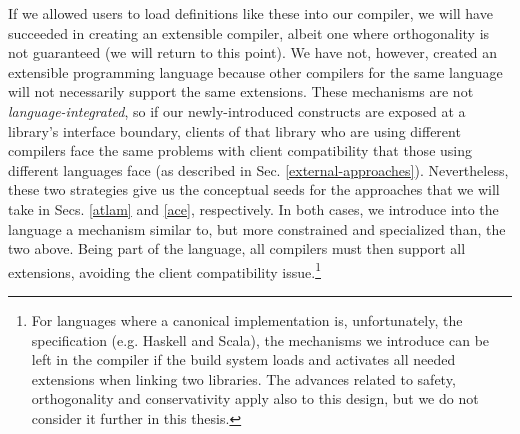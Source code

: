 If we allowed users to load definitions like these into our compiler, we will have succeeded in creating an  extensible compiler, albeit one where orthogonality is not guaranteed (we will return to this point). We have not, however, created an extensible programming language because other compilers for the same language will not necessarily support the same extensions. These mechanisms are not \emph{language-integrated}, so if our newly-introduced constructs are exposed at a library's  interface boundary, clients of that library who are using different compilers face the same problems with client compatibility that those using different languages face (as described in Sec. \ref{external-approaches}). %
Nevertheless, these two strategies give us the conceptual seeds for the approaches that we will take in Secs. \ref{atlam} and \ref{ace}, respectively. 
In both cases, we introduce into the language a mechanism similar to, but more constrained and specialized  than, the two above.  Being part of the language, all compilers must then support all extensions, avoiding the client compatibility issue.\footnote{For  languages where a canonical implementation {is}, unfortunately, the specification (e.g. Haskell and Scala), the mechanisms we introduce can be left in the compiler if the build system loads and activates all needed extensions when linking two libraries. The advances related to safety, orthogonality and conservativity apply also to this design, but we do not consider it further in this thesis.}




